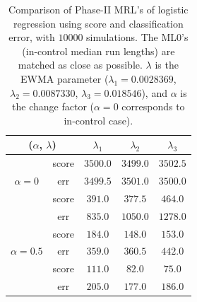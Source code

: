 \documentclass[twoside,11pt]{article}
\begin{document}
\begin{table}[!t]
\centering
\begin{tabular}{ccccc}
\toprule
\multicolumn{2}{c}{($ \alpha$, $ \lambda$)} & {$  \lambda_1$} & {$ \lambda_2$} & {$ \lambda_3$} \\
\midrule
\multirow{3}{*}{$\alpha = 0$} & score &$3500.0$ & $3499.0$ & $3502.5$ \\
& err &$3499.5$ & $3501.0$ & $3500.0$ \\
\midrule
\multirow{3}{*}{$\alpha = 0.3$} & score &$\bm{391.0}$ & $\bm{377.5}$ & $\bm{464.0}$ \\
& err &$835.0$ & $1050.0$ & $1278.0$ \\
\midrule
\multirow{3}{*}{$\alpha = 0.5$} & score &$\bm{184.0}$ & $\bm{148.0}$ & $\bm{153.0}$ \\
& err &$359.0$ & $360.5$ & $442.0$ \\
\midrule
\multirow{3}{*}{$\alpha = 0.7$} & score &$\bm{111.0}$ & $\bm{82.0}$ & $\bm{75.0}$ \\
& err &$205.0$ & $177.0$ & $186.0$ \\
\midrule
\end{tabular}
\caption{Comparison of Phase-II MRL's of logistic regression using score and classification error, with $10000$ simulations. The ML0's (in-control median run lengths) are matched as close as possible. $ \lambda$ is the EWMA parameter ({$ \lambda_1 = 0.0028369$}, {$ \lambda_2 = 0.0087330$}, {$ \lambda_3 = 0.018546$}), and $ \alpha$ is the change factor ($ \alpha=0$ corresponds to in-control case).}
\label{tab:logi_MRL}
\end{table}
\end{document}
